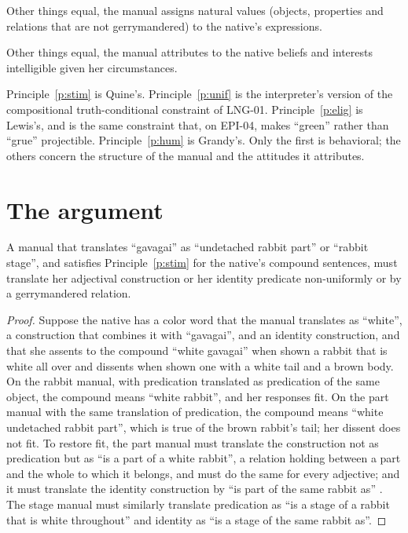 \documentclass{situationist-preprint}
\begin{document}
\begin{principle}[Eligibility]\label{p:elig}
Other things equal, the manual assigns natural values (objects, properties and relations that are not gerrymandered) to the native's expressions.
\end{principle}

\begin{principle}[Humanity]\label{p:hum}
Other things equal, the manual attributes to the native beliefs and interests intelligible given her circumstances.
\end{principle}

Principle~\ref{p:stim} is Quine's. Principle~\ref{p:unif} is the interpreter's version of the compositional truth-conditional constraint of LNG-01. Principle~\ref{p:elig} is Lewis's, and is the same constraint that, on EPI-04, makes \enquote{green} rather than \enquote{grue} projectible. Principle~\ref{p:hum} is Grandy's. Only the first is behavioral; the others concern the structure of the manual and the attitudes it attributes.

\section{The argument}

\begin{lemma}[Predication]\label{l:pred}
A manual that translates \enquote{gavagai} as \enquote{undetached rabbit part} or \enquote{rabbit stage}, and satisfies Principle~\ref{p:stim} for the native's compound sentences, must translate her adjectival construction or her identity predicate non-uniformly or by a gerrymandered relation.
\end{lemma}

\begin{proof}
Suppose the native has a color word that the manual translates as \enquote{white}, a construction that combines it with \enquote{gavagai}, and an identity construction, and that she assents to the compound \enquote{white gavagai} when shown a rabbit that is white all over and dissents when shown one with a white tail and a brown body. On the rabbit manual, with predication translated as predication of the same object, the compound means \enquote{white rabbit}, and her responses fit. On the part manual with the same translation of predication, the compound means \enquote{white undetached rabbit part}, which is true of the brown rabbit's tail; her dissent does not fit. To restore fit, the part manual must translate the construction not as predication but as \enquote{is a part of a white rabbit}, a relation holding between a part and the whole to which it belongs, and must do the same for every adjective; and it must translate the identity construction by \enquote{is part of the same rabbit as} \citep{Evans1975}. The stage manual must similarly translate predication as \enquote{is a stage of a rabbit that is white throughout} and identity as \enquote{is a stage of the same rabbit as}.
\end{proof}
\end{document}
